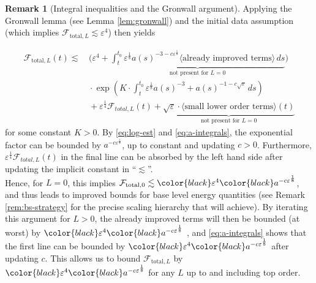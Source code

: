 \documentclass[11pt,leqno,textwidth=10cm]{amsart}
\numberwithin{equation}{section}
\theoremstyle{definition}
\newtheorem{remark}[definition]{Remark}
\theoremstyle{plain}
\newcommand{\1}{\mathbbm{1}}
\renewcommand{\epsilon}{\varepsilon}
\newcommand{\change}[1]{\color{black}#1\color{black}}
\newcommand{\delete}[1]{}
\begin{document}
\begin{remark}[Integral inequalities and the Gronwall argument]
Applying the Gronwall lemma (see Lemma \ref{lem:gronwall}) and the initial data assumption (which implies $\mathcal{F}_{\text{total},L}\lesssim\epsilon^4$) then yields

\change{\begin{align*}
\mathcal{F}_{\text{total},L}(t)\lesssim&\,\biggr(\epsilon^4+\underbrace{\int_t^{t_0}\epsilon^\frac18 a(s)^{-3-c\epsilon^\frac18}\langle\text{already improved terms}\rangle\,ds}_{\text{not present for }L=0}\biggr)\\
&\,\cdot\exp\left(K\cdot \int_t^{t_0}\epsilon^\frac18a(s)^{-3}+a(s)^{-1-c\sqrt{\epsilon}}\,ds\right)\\
&\,+\epsilon^\frac14\mathcal{F}_{total,L}(t)+\underbrace{\sqrt{\epsilon}\cdot\langle\text{small lower order terms}\rangle(t)}_{\text{not present for }L=0}
\end{align*}}
for some constant $K>0$. By \eqref{eq:log-est} and \eqref{eq:a-integrals}, the exponential factor \delete{in the final line }can be bounded by $a^{-c\epsilon^\frac18}$, up to constant and updating $c>0$\change{. Furthermore, $\epsilon^\frac14\mathcal{F}_{total,L}(t)$ in the final line can be absorbed by the left hand side after updating the implicit constant in \enquote{$\lesssim$}. \\
 Hence}, for $L=0$, this implies $\mathcal{F}_{\text{total},0}\lesssim\change{\epsilon^4}a^{-c\epsilon^\frac18}$, and thus leads to improved bounds for base level energy quantities (see Remark \ref{rem:bs-strategy} for the precise scaling hierarchy that will achieve). 
By iterating this argument for $L>0$, the already improved terms will then be bounded (at worst) by $\change{\epsilon^4}a^{-c\epsilon^\frac18}$ , and \eqref{eq:a-integrals} shows that the first line can be bounded by $\change{\epsilon^4}a^{-c\epsilon^\frac18}$ after updating $c$. \change{This allows us }to bound $\mathcal{F}_{\text{total},L}$ by $\change{\epsilon^4}a^{-c\epsilon^\frac18}$ for any $L$ up to and including top order. \\


\end{remark}
\end{document}
